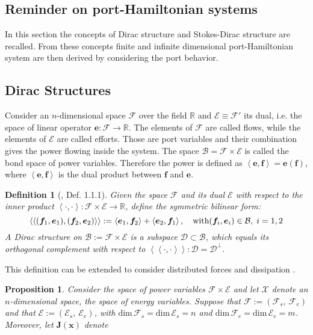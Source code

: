 \documentclass[preprint,12pt]{elsarticle}
\newcommand{\secondReviewer}[1]{\textcolor{blue!80!black}{#1}}
\newtheorem{definition}{Definition}
\newtheorem{proposition}{Proposition}
\begin{document}
\secondReviewer{
\section{Reminder on port-Hamiltonian systems}
In this section the concepts of Dirac structure and Stokes-Dirac structure are recalled. From these concepts finite and infinite dimensional port-Hamiltonian system are then derived by considering the port behavior. 
\subsection{Dirac Structures}
Consider an $n$-dimensional space $\mathcal{F}$ over the field $\mathbb{R}$ and $\mathcal{E} \equiv \mathcal{F}'$ its dual, i.e. the space of linear operator $\bm{e} : \mathcal{F} \rightarrow \mathbb{R}$. The elements of $\mathcal{F}$ are called flows, while the elements of $\mathcal{E}$ are called efforts. Those are port variables and their combination gives the power flowing inside the system. The space $\mathcal{B} = \mathcal{F} \times \mathcal{E}$ is called the bond space of power variables. Therefore the power is defined as  $\left\langle \bm{e}, \bm{f} \right\rangle = \bm{e}(\bm{f})$, where $\left\langle \bm{e} , \bm{f} \right\rangle$ is the dual product between $\bm{f}$ and $\bm{e}$.
\begin{definition}[\cite{CourantDiracStructure}, Def. 1.1.1]
	Given the space $\mathcal{F}$ and its dual $\mathcal{E}$ with respect to the inner product $\left\langle \cdot , \cdot \right\rangle : \mathcal{F} \times \mathcal{E} \rightarrow \mathbb{R}$, define the symmetric bilinear form:
	\begin{equation}
	\left\langle \left\langle (\bm{f}_1, \bm{e}_1), (\bm{f}_2, \bm{e}_2) \right\rangle \right\rangle := \left\langle \bm{e}_1, \bm{f}_2 \right\rangle +  \left\langle \bm{e}_2, \bm{f}_1 \right\rangle, \quad \text{with} \text (\bm{f}_i, \bm{e}_i) \in \mathcal{B}, \; i = 1, 2
	\end{equation}
	A Dirac structure on $\mathcal{B} := \mathcal{F} \times \mathcal{E}$ is a subspace $\mathcal{D} \subset \mathcal{B}$, which equals its orthogonal complement with respect to $\left\langle \left\langle \cdot, \cdot \right\rangle \right\rangle: \mathcal{D} =\mathcal{D}^\perp$.
\end{definition}
This definition can be extended to consider distributed forces and dissipation \cite{Villegas}.
\begin{proposition}
	\label{prop:Dirac}
Consider the space of power variables $\mathcal{F} \times \mathcal{E}$ and let $\mathcal{X}$ denote an $n$-dimensional space, the space of energy variables. Suppose that $\mathcal{F} := (\mathcal{F}_s, \ \mathcal{F}_e )$ and that $\mathcal{E} := (\mathcal{E}_s,  \ \mathcal{E}_e )$, with $\text{dim} \, \mathcal{F}_s = \text{dim} \, \mathcal{E}_s = n$ and $\text{dim} \, \mathcal{F}_e = \text{dim} \, \mathcal{E}_e = m$. Moreover, let $\bm{J}(\bm{x})$ denote

\end{proposition}}
\end{document}
